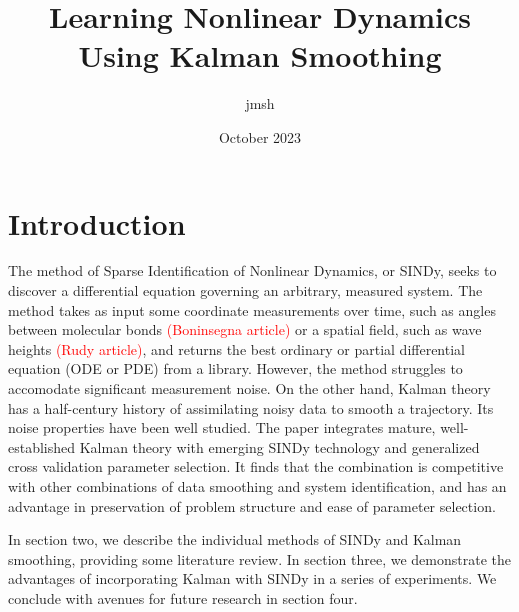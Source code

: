 \documentclass{article}[letterpaper]
\title{Learning Nonlinear Dynamics Using Kalman Smoothing}
\author{jmsh}
\date{October 2023}
\newcommand{\red}[1]{\textcolor{red}{#1}}
\begin{document}
\maketitle


\section{Introduction}
The method of Sparse Identification of Nonlinear Dynamics, or SINDy, seeks to discover a differential equation governing an arbitrary, measured system.  The method takes as input some coordinate measurements over time, such as angles between molecular bonds \red{(Boninsegna article)} or a spatial field, such as wave heights \red{(Rudy article)}, and returns the best ordinary or partial differential equation (ODE or PDE) from a library.  However, the method struggles to accomodate significant measurement noise.  On the other hand, Kalman theory has a half-century history of assimilating noisy data to smooth a trajectory.  Its noise properties have been well studied. The paper integrates mature, well-established Kalman theory with emerging SINDy technology and generalized cross validation parameter selection.  It finds that the combination is competitive with other combinations of data smoothing and system identification, and has an advantage in preservation of problem structure and ease of parameter selection.

In section two, we describe the individual methods of SINDy and Kalman smoothing, providing some literature review.  In section three, we demonstrate the advantages of incorporating Kalman with SINDy in a series of experiments.  We conclude with avenues for future research in section four.
\end{document}
